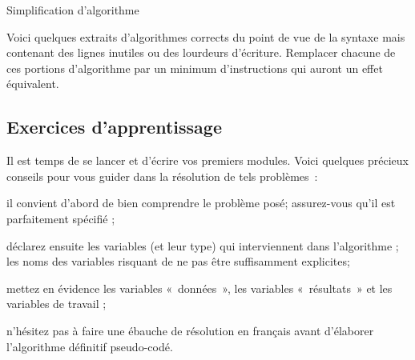 \begin{Exercice}{Simplification d'algorithme}

	Voici quelques extraits d’algorithmes corrects du point de vue de la
	syntaxe mais contenant des lignes inutiles ou des lourdeurs d’écriture.
	Remplacer chacune de ces portions d’algorithme par un minimum
	d’instructions qui auront un effet équivalent.





\end{Exercice}

\subsection{Exercices d’apprentissage}

	Il est temps de se lancer et d'écrire vos premiers
	modules. Voici quelques précieux conseils pour vous 
	guider dans la résolution de tels problèmes~:

	\begin{liste}
	\item {
		il convient d’abord de bien comprendre le problème posé; assurez-vous
		qu’il est parfaitement spécifié ;}
	\item {
		déclarez ensuite les variables (et leur type) qui interviennent dans
		l’algorithme ; les noms des variables risquant de ne pas être
		suffisamment explicites;}
	\item {
		mettez en évidence les variables «~données~», les variables
		«~résultats~» et les variables de travail ;}
	\item {
		n’hésitez pas à faire une ébauche de résolution en français avant
		d’élaborer l’algorithme définitif pseudo-codé.}
	\end{liste}

